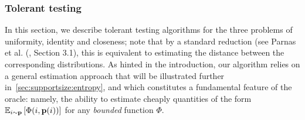  \subsubsection{Tolerant testing}\label{sec:uniformity:equivalence:identity:testing:tolerant}
In this section, we describe tolerant testing algorithms for the three problems of uniformity, identity and closeness; note that by a standard reduction (see Parnas et al. (\cite{PRR:06}, Section 3.1), this is equivalent to estimating the distance between the corresponding distributions. As hinted in the introduction, our algorithm relies on a general estimation approach that will be illustrated further in~\cref{sec:supportsize:entropy}, and which constitutes a fundamental feature of the \pdfsamp oracle: namely, the ability to estimate cheaply quantities of the form
$\mathbb{E}_{i\sim \mathbf{p}}\left[ \Phi(i,\mathbf{p}(i)) \right]$ for any \emph{bounded} function $\Phi$.

